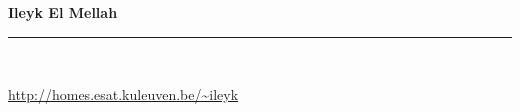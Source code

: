\documentclass[a4paper,oneside]{cv}
\newcommand{\ligne}[1]{\rule[0.5ex]{\textwidth}{#1}\\}
\begin{document}
\vspace*{-1cm}
\begin{chapeau}
\begin{flushright}
\begin{adresse}
	\begin{Large}
	\textbf{Ileyk El Mellah}\\%
	\end{Large}	
	\ligne\\%
	\begin{large}
	\href{http://homes.esat.kuleuven.be/~ileyk}{http://homes.esat.kuleuven.be/\textasciitilde ileyk}\\
	\end{large}
\end{adresse}
\end{flushright}
\end{chapeau}
\vspace*{-3.2cm}
\\ \\ \\ \\ \\ \\
\end{document}
